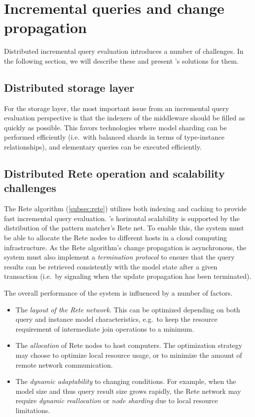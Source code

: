 \section{Incremental queries and change propagation}
\label{sec:incrementality}

Distributed incremental query evaluation introduces a number of challenges. In the following section, we will describe these and present \iqd{}'s solutions for them.

\subsection{Distributed storage layer}

For the storage layer, the most important issue from an incremental query evaluation perspective is that the indexers of the middleware should be filled as quickly as possible. This favors technologies where model sharding can be performed efficiently (i.e.\ with balanced shards in terms of type-instance relationships), and elementary queries 
can be executed efficiently.


\subsection{Distributed Rete operation and scalability challenges}

The Rete algorithm (\autoref{subsec:rete}) utilizes both indexing and caching to provide fast incremental query evaluation. \iqd{}'s horizontal scalability is supported by the distribution of the pattern matcher's Rete net. To enable this, the system must be able to allocate the Rete nodes to different hosts in a cloud computing infrastructure. As the Rete algorithm's change propagation is asynchronous, the system must also implement a \emph{termination protocol} to ensure that the query results can be retrieved consistently with the model state after a given transaction (i.e.\ by signaling when the update propagation has been terminated).

The overall performance of the system is influenced by a number of factors.

\begin{itemize}
  \item The \emph{layout of the Rete network}. This can be optimized depending on both query and instance model characteristics, e.g.\ to keep the resource requirement of intermediate join operations to a minimum.
  \item The \emph{allocation} of Rete nodes to host computers. The optimization strategy may choose to optimize local resource usage, or to minimize the amount of remote network communication.
  \item The \emph{dynamic adaptability} to changing conditions. For example, when the model size and thus query result size grows rapidly, the Rete network may require \emph{dynamic reallocation} or \emph{node sharding} due to local resource limitations.
\end{itemize}


